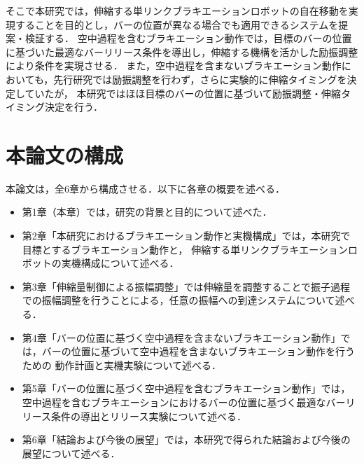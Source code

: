           そこで本研究では，伸縮する単リンクブラキエーションロボットの自在移動を実現することを目的とし，バーの位置が異なる場合でも適用できるシステムを提案・検証する．
          空中過程を含むブラキエーション動作では，目標のバーの位置に基づいた最適なバーリリース条件を導出し，伸縮する機構を活かした励振調整により条件を実現させる．
          また，空中過程を含まないブラキエーション動作においても，先行研究では励振調整を行わず，さらに実験的に伸縮タイミングを決定していたが\cite{Hijiri:Robomech2024}，
          本研究ではほほ目標のバーの位置に基づいて励振調整・伸縮タイミング決定を行う．
          
        \section{本論文の構成}

          本論文は，全6章から構成させる．以下に各章の概要を述べる．
          \begin{itemize}
            \item 第1章（本章）では，研究の背景と目的について述べた．
            \item 第2章「本研究におけるブラキエーション動作と実機構成」では，本研究で目標とするブラキエーション動作と，
            伸縮する単リンクブラキエーションロボットの実機構成について述べる．
            \item 第3章「伸縮量制御による振幅調整」では伸縮量を調整することで振子過程での振幅調整を行うことによる，任意の振幅への到達システムについて述べる．
            \item 第4章「バーの位置に基づく空中過程を含まないブラキエーション動作」では，バーの位置に基づいて空中過程を含まないブラキエーション動作を行うための
            動作計画と実機実験について述べる．
            \item 第5章「バーの位置に基づく空中過程を含むブラキエーション動作」では，空中過程を含むブラキエーションにおけるバーの位置に基づく最適なバーリリース条件の導出とリリース実験について述べる．         
            \item 第6章「結論および今後の展望」では，本研究で得られた結論および今後の展望について述べる．
          \end{itemize}

          

